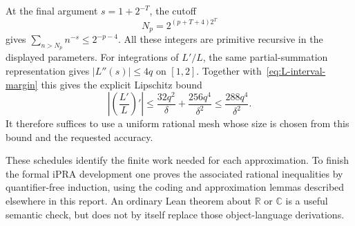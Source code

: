 At the final argument $s=1+2^{-T}$, the cutoff
\[
 N_p=2^{(p+T+4)2^T}
\]
gives
$\sum_{n>N_p}n^{-s}\leq2^{-p-4}$.  All these integers are primitive
recursive in the displayed parameters.  For integrations of $L'/L$, the
same partial-summation representation gives $|L''(s)|\leq4q$ on $[1,2]$.
Together with~\eqref{eq:L-interval-margin} this gives the explicit
Lipschitz bound
\[
 \left|\left(\frac{L'}{L}\right)'\right|
 \leq\frac{32q^2}{\delta}+\frac{256q^4}{\delta^2}
 \leq\frac{288q^4}{\delta^2}.
\]
It therefore suffices to use a uniform rational mesh whose size is chosen
from this bound and the requested accuracy.

These schedules identify the finite work needed for each approximation.
To finish the formal iPRA development one proves the associated rational
inequalities by quantifier-free induction, using the coding and
approximation lemmas described elsewhere in this report.  An ordinary
Lean theorem about $\mathbb R$ or $\mathbb C$ is a useful semantic check, but
does not by itself replace those object-language derivations.
